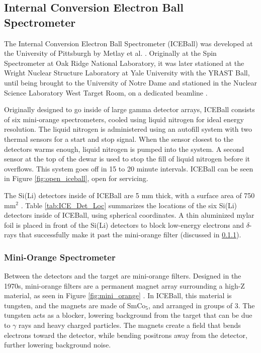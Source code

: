 \subsection{Internal Conversion Electron Ball Spectrometer}

The Internal Conversion Electron Ball Spectrometer (ICEBall) was developed at the University of Pittsburgh by Metlay et al. \citep{metlay92:_iceball_comm,metlay93:_iceball_comm}. Originally at the Spin Spectrometer at Oak Ridge National Laboratory, it was later stationed at the Wright Nuclear Structure Laboratory at Yale University with the YRAST Ball, until being brought to the University of Notre Dame and stationed in the Nuclear Science Laboratory West Target Room, on a dedicated beamline \citep{battaglia15:_iceball_176lu}.

Originally designed to go inside of large gamma detector arrays, ICEBall consists of six mini-orange spectrometers, cooled using liquid nitrogen for ideal energy resolution. The liquid nitrogen is administered using an autofill system with two thermal sensors for a start and stop signal. When the sensor closest to the detectors warms enough, liquid nitrogen is pumped into the system. A second sensor at the top of the dewar is used to stop the fill of liquid nitrogen before it overflows. This system goes off in 15 to 20 minute intervals. ICEBall can be seen in Figure \ref{fig:open_iceball}, open for servicing.



The Si(Li) detectors inside of ICEBall are 5 mm thick, with a surface area of 750 mm$^2$ \citep{metlay93:_iceball_comm}. Table \ref{tab:ICE_Det_Loc} summarizes the locations of the six Si(Li) detectors inside of ICEBall, using spherical coordinates. A thin aluminized mylar foil is placed in front of the Si(Li) detectors to block low-energy electrons and $\delta$-rays that successfully make it past the mini-orange filter (discussed in \ref{sec:mini_orange}).



\subsubsection{Mini-Orange Spectrometer}
\label{sec:mini_orange}

Between the detectors and the target are mini-orange filters. Designed in the 1970s, mini-orange filters are a permanent magnet array surrounding a high-Z material, as seen in Figure \ref{fig:mini_orange} \citep{vanklinken72:mini_orange, vanklinken75:mini_orange}. In ICEBall, this material is tungsten, and the magnets are made of SmCo$_5$, and arranged in groups of 3. The tungsten acts as a blocker, lowering background from the target that can be due to $\gamma$ rays and heavy charged particles. The magnets create a field that bends electrons toward the detector, while bending positrons away from the detector, further lowering background noise. 

